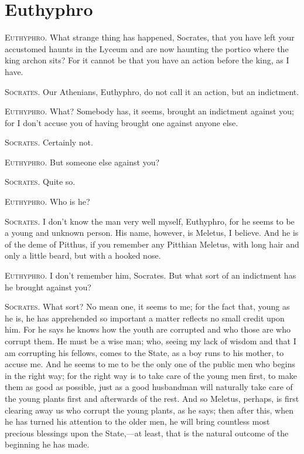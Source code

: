 
\author{Plato}
\chapter{Euthyphro}


\textsc{Euthyphro}. What strange thing has happened, Socrates,
that you have left your accustomed haunts in the Lyceum and are now
haunting the portico where the king archon sits? For it cannot be that
you have an action before the king, as I have.

\textsc{Socrates}. Our Athenians, Euthyphro, do not call it an action,
but an indictment.

\textsc{Euthyphro}. What? Somebody has, it seems, brought an
indictment against you; for I don't accuse you of having brought one
against anyone else.

\textsc{Socrates}. Certainly not.

\textsc{Euthyphro}. But someone else against you?

\textsc{Socrates}. Quite so.

\textsc{Euthyphro}. Who is he?

\textsc{Socrates}. I don't know the man very well myself, Euthyphro,
for he seems to be a young and unknown person. His name, however, is
Meletus, I believe. And he is of the deme of Pitthus, if you remember
any Pitthian Meletus, with long hair and only a little beard, but with
a hooked nose.

\textsc{Euthyphro}. I don't remember him, Socrates. But what
sort of an indictment has he brought against you?

\textsc{Socrates}. What sort? No mean one, it seems to me; for the
fact that, young as he is, he has apprehended so important a matter
reflects no small credit upon him. For he says he knows how the youth
are corrupted and who those are who corrupt them. He must be a wise
man; who, seeing my lack of wisdom and that I am corrupting his
fellows, comes to the State, as a boy runs to his mother, to accuse
me. And he seems to me to be the only one of the public men who begins
in the right way; for the right way is to take care of the young men
first, to make them as good as possible, just as a good husbandman
will naturally take care of the young plants first and afterwards of
the rest. And so Meletus, perhaps, is first clearing away us who
corrupt the young plants, as he says; then after this, when he has
turned his attention to the older men, he will bring countless most
precious blessings upon the State,---at least, that is the natural
outcome of the beginning he has made.

